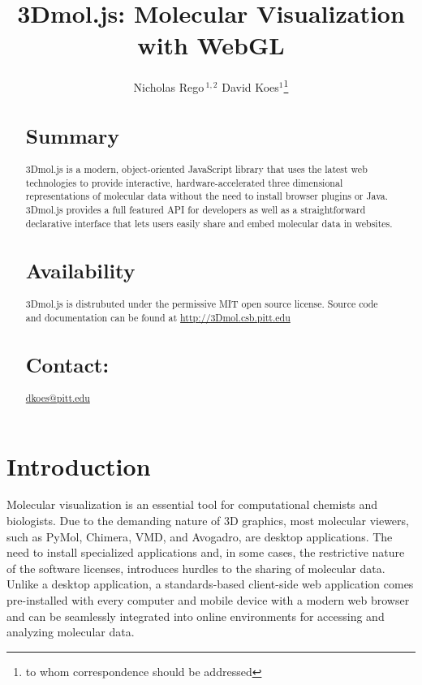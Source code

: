 \documentclass[]{bioinfo}
\begin{document}

\title[3Dmol.js: Molecular Visualization with WebGL]{3Dmol.js: Molecular Visualization with WebGL}
\author[Rego and Koes]{Nicholas Rego\,$^{1,2}$ David Koes$^{1}$\footnote{to whom correspondence should be addressed}}
\address{$^{1}$Department of Computational and Systems Biology, University of Pittsburgh, Pittsburgh, PA 15260\\
$^{2}$Department of XXXXXXXX, Address XXXX etc.}



\maketitle
\begin{abstract}
\section{Summary} 3Dmol.js is a modern, object-oriented JavaScript library that uses the latest web technologies
to provide interactive, hardware-accelerated three dimensional representations of molecular data without the
need to install browser plugins or Java.  3Dmol.js provides a full featured API for developers as well
as a straightforward declarative interface that lets users easily share and embed molecular data in websites.
\section{Availability} 3Dmol.js is distrubuted under the permissive MIT open source license.
Source code and documentation can be found at \url{http://3Dmol.csb.pitt.edu}
\section{Contact:} \href{dkoes@pitt.edu}{dkoes@pitt.edu}
\end{abstract}

\section{Introduction}
Molecular visualization is an essential tool for computational chemists and biologists. Due to the demanding nature of 3D graphics, most molecular viewers, such as PyMol\cite{delano2002pymol}, Chimera\cite{pettersen2004ucsf}, VMD\cite{humphrey1996vmd}, and Avogadro\cite{hanwell2012avogadro}, are desktop applications.  The need to install specialized applications and, in some cases, the restrictive nature of the software licenses, introduces hurdles to the sharing of molecular data.  Unlike a desktop application, a standards-based client-side web application comes pre-installed with every computer and mobile device with a modern web browser and can be seamlessly integrated into online environments for accessing and analyzing molecular data.
\end{document}
